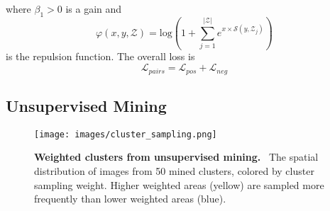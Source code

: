 where $\beta_1>0$ is a gain and
{\small
\begin{equation}
    \varphi(x,y,\mathcal{Z}) = \text{log} \left( 1 + \sum_{j=1}^{|\mathcal{Z}|} e^{x \times \mathcal{S}(y,\mathcal{Z}_j)} \right)
\end{equation}
}
is the repulsion function.
The overall loss is 
{\small
\begin{equation}
    \mathcal{L}_{pairs} = \mathcal{L}_{pos} + \mathcal{L}_{neg}
\end{equation}
}



\subsection{Unsupervised Mining}
\label{sec:cluster_sampling}

\begin{figure}
    \begin{center}
    \texttt{[image: images/cluster\_sampling.png]}
    \end{center}
    \vspace{-5mm}
    \caption{\textbf{Weighted clusters from unsupervised mining.} ~The spatial distribution of images from 50 mined clusters, colored by cluster sampling weight. Higher weighted areas (yellow) are sampled more frequently than lower weighted areas (blue).
    }
    \vspace{-5mm}
    \label{fig:cluster_sampling}
\end{figure}

